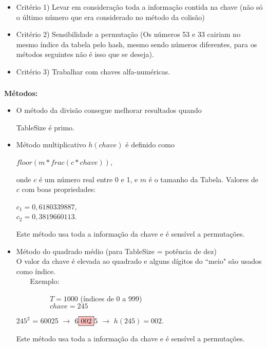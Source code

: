 \documentclass[a4paper, 12pt]{article}
\begin{document}
\begin{itemize}
\item Critério 1) Levar em consideração toda a informação contida na chave (não só o último número que era considerado no método da colisão)
\item Critério 2) Sensibilidade a permutação (Os números 53 e 33 cairiam no mesmo índice da tabela pelo hash, mesmo sendo números diferentes, para os métodos seguintes não é isso que se deseja).
\item Critério 3) Trabalhar com chaves alfa-numéricas.
\end{itemize}
\textcolor{white}{$\rightarrow$}
\\
\textbf{Métodos:}
\begin{itemize}
\item {} O método da divisão consegue melhorar resultados quando 

TableSize é primo.

\item {} Método multiplicativo $h(chave)$ é definido como 
\begin{center}
$floor(m * frac(c * chave))$,
\end{center}
onde $c$ é um número real entre 0 e 1, e $m$ é o tamanho da Tabela.
Valores de $c$ com boas propriedades:
\begin{center}
$c_{1} = 0,6180339887$,\\
$c_{2} = 0,3819660113$.\\
\end{center}
Este método usa toda a informação da chave e é sensível a permutações.
 
\pagebreak
\item {} Método do quadrado médio (para TableSize = potência de dez)\\
O valor da chave é elevada ao quadrado e alguns dígitos do ``meio" são usados como índice.\\
\textcolor{white}{$\rightarrow$} Exemplo:

\textcolor{white}{$\rightarrow \rightarrow \rightarrow$}$T = 1000$ (índices de 0 a 999)\\
\textcolor{white}{$\rightarrow \rightarrow \rightarrow$}$chave = 245$
\begin{center}
$245^2$ = 60025 $\rightarrow$ $6\fcolorbox{black}{pink}{002}5$ $\rightarrow$ $h(245) = 002$.
\end{center}
Este método usa toda a informação da chave e é sensível a permutações.


\end{itemize}
\end{document}
